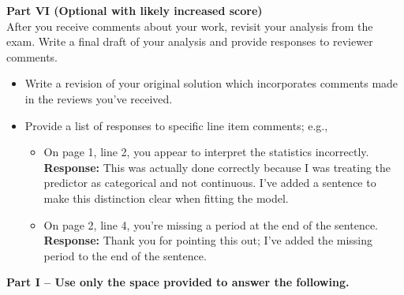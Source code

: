\documentclass{article}
\begin{document}
\noindent \textbf{Part VI (Optional with likely increased score)}\\
After you receive comments about your work, revisit your analysis from the exam. 
Write a final draft of your analysis and provide responses to reviewer comments.
\begin{itemize}
  \item Write a revision of your original solution which incorporates comments made
  in the reviews you've received.
  \item Provide a list of responses to specific line item comments; e.g.,
  \begin{itemize}
    \item On page 1, line 2, you appear to interpret the statistics incorrectly.\\
        \textbf{Response:} This was actually done correctly because I was treating 
        the predictor as categorical and not continuous. I've added a sentence to
        make this distinction clear when fitting the model.
    \item On page 2, line 4, you're missing a period at the end of the sentence.\\
        \textbf{Response:} Thank you for pointing this out; I've added the missing
        period to the end of the sentence.
  \end{itemize}
\end{itemize}
\newpage
\textbf{Part I -- Use only the space provided to answer the following.}\\
\end{document}
